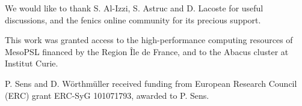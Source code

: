 \begin{acknowledgments}
    We would like to thank S. Al-Izzi, S. Astruc and D. Lacoste for useful discussions, and  the \ac{fenics} online community for its precious support.

    This work was granted access to the high-performance computing resources of MesoPSL financed by the Region
    \^Ile de France, and to the Abacus cluster at Institut Curie.

    P. Sens and D. W\"orthm\"uller received funding from  European Research Council (ERC) grant ERC-SyG 101071793, awarded to P. Sens.

\end{acknowledgments}
